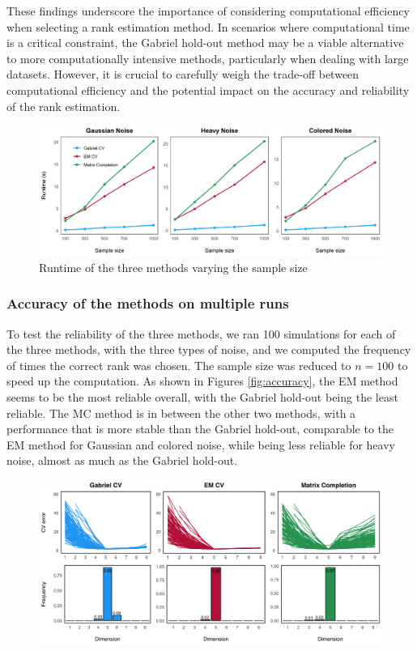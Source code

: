 \documentclass{article}
\begin{document}
These findings underscore the importance of considering computational efficiency when selecting a rank 
estimation method. In scenarios where computational time is a critical constraint, the Gabriel hold-out 
method may be a viable alternative to more computationally intensive methods, particularly when dealing 
with large datasets. However, it is crucial to carefully weigh the trade-off between computational efficiency 
and the potential impact on the accuracy and reliability of the rank estimation.

\begin{figure}[h!]
    \centering
    \includegraphics[width=\textwidth]{runtime_versus_n.png}
    \caption{Runtime of the three methods varying the sample size}
    \label{fig:Time_versus_n}
\end{figure}

\subsubsection{Accuracy of the methods on multiple runs}
To test the reliability of the three methods, we ran 100 simulations for each of the three methods, with the three types of noise, 
and we computed the frequency of times the correct rank was chosen. The sample size was reduced to $n=100$ to speed up the computation.
As shown in Figures \ref{fig:accuracy}, the EM method seems to be the most reliable overall, with the Gabriel hold-out being the least 
reliable. The MC method is in between the other two methods, with a performance that is more stable than the Gabriel 
hold-out, comparable to the EM method for Gaussian and colored noise, while being less reliable for heavy noise, almost as much 
as the Gabriel hold-out.

\begin{figure}[H]
    \centering
    \includegraphics[width=\textwidth]{100gaussian.png}
\end{figure}
\end{document}
